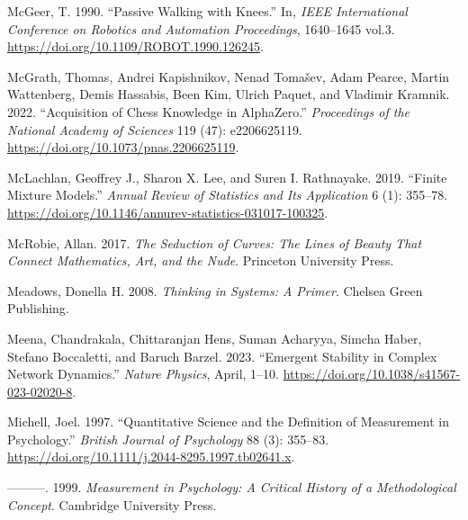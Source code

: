 \documentclass[
  a4paper,
  DIV=11,
  numbers=noendperiod,
  oneside]{scrreprt}
\newlength{\cslhangindent}
\newlength{\cslentryspacingunit} %
\newenvironment{CSLReferences}[2] %
 {%
  \setlength{\parindent}{0pt}
  \ifodd #1
  \let\oldpar\par
  \def\par{\hangindent=\cslhangindent\oldpar}
  \fi
  \setlength{\parskip}{#2\cslentryspacingunit}
 }%
 {}
\begin{document}
\begin{CSLReferences}{1}{0}
\leavevmode{}%
McGeer, T. 1990. {``Passive Walking with Knees.''} In\emph{, {IEEE
International Conference} on {Robotics} and {Automation Proceedings}},
1640--1645 vol.3. \url{https://doi.org/10.1109/ROBOT.1990.126245}.

\leavevmode{}%
McGrath, Thomas, Andrei Kapishnikov, Nenad Tomašev, Adam Pearce, Martin
Wattenberg, Demis Hassabis, Been Kim, Ulrich Paquet, and Vladimir
Kramnik. 2022. {``Acquisition of Chess Knowledge in {AlphaZero}.''}
\emph{Proceedings of the National Academy of Sciences} 119 (47):
e2206625119. \url{https://doi.org/10.1073/pnas.2206625119}.

\leavevmode{}%
McLachlan, Geoffrey J., Sharon X. Lee, and Suren I. Rathnayake. 2019.
{``Finite {Mixture Models}.''} \emph{Annual Review of Statistics and Its
Application} 6 (1): 355--78.
\url{https://doi.org/10.1146/annurev-statistics-031017-100325}.

\leavevmode{}%
McRobie, Allan. 2017. \emph{The {Seduction} of {Curves}: {The Lines} of
{Beauty That Connect Mathematics}, {Art}, and the {Nude}}. {Princeton
University Press}.

\leavevmode{}%
Meadows, Donella H. 2008. \emph{Thinking in {Systems}: {A Primer}}.
{Chelsea Green Publishing}.

\leavevmode{}%
Meena, Chandrakala, Chittaranjan Hens, Suman Acharyya, Simcha Haber,
Stefano Boccaletti, and Baruch Barzel. 2023. {``Emergent Stability in
Complex Network Dynamics.''} \emph{Nature Physics}, April, 1--10.
\url{https://doi.org/10.1038/s41567-023-02020-8}.

\leavevmode{}%
Michell, Joel. 1997. {``Quantitative Science and the Definition of
Measurement in Psychology.''} \emph{British Journal of Psychology} 88
(3): 355--83. \url{https://doi.org/10.1111/j.2044-8295.1997.tb02641.x}.

\leavevmode{}%
---------. 1999. \emph{Measurement in {Psychology}: {A Critical History}
of a {Methodological Concept}}. {Cambridge University Press}.


\end{CSLReferences}
\end{document}
